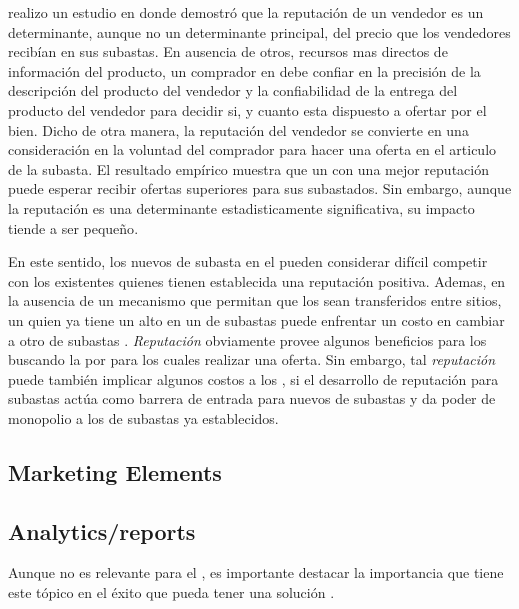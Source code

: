 \ebay realizo un estudio en donde demostró que la reputación \ecommerce de un vendedor es un determinante, aunque no un determinante principal, del precio que los vendedores recibían en sus subastas. En ausencia de otros, recursos mas directos de información del producto, un comprador en \internet debe confiar en la precisión de la descripción del producto del vendedor y la confiabilidad de la entrega del producto del vendedor para decidir si, y cuanto esta dispuesto a ofertar por el bien. Dicho de otra manera, la reputación del vendedor se convierte en una consideración en la voluntad del comprador para hacer una oferta en el articulo de la subasta. El resultado empírico muestra que un \seller con una mejor reputación puede esperar recibir ofertas superiores para sus \itemscommerce subastados. Sin embargo, aunque la reputación es una determinante estadisticamente significativa, su impacto tiende a ser pequeño\cite{melnik2002does}.

En este sentido, los nuevos \seller de subasta en el \websites pueden considerar difícil competir con los \sellers existentes quienes tienen establecida una reputación positiva. Ademas, en la ausencia de un mecanismo que permitan que los \ratings sean transferidos entre sitios, un \seller quien ya tiene un alto \rating en un \website de subastas \online puede enfrentar un costo en cambiar a otro \website de subastas \online. \textit{Reputación} obviamente provee algunos beneficios para los \consumers buscando  la \internet por \itemscommerce para los cuales realizar una oferta. Sin embargo, tal \textit{reputación} puede también implicar algunos costos a los \consumers, si el desarrollo de reputación para subastas \online actúa como barrera de entrada para nuevos \websites de  subastas \online  y da poder de monopolio a los \websites de subastas \online ya establecidos\cite{melnik2002does}.

\subsection{Marketing Elements}
\subsection{Analytics/reports}





Aunque no es relevante para el \framework, es importante destacar la importancia que tiene este tópico en el éxito que pueda tener una solución \ecommerce. 

